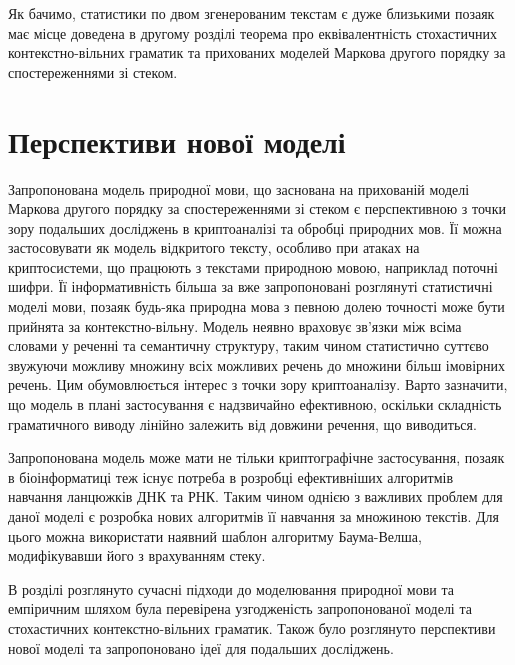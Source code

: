 Як бачимо, статистики по двом згенерованим текстам є дуже близькими позаяк має місце доведена в другому розділі теорема про еквівалентність стохастичних контекстно-вільних граматик та прихованих моделей Маркова другого порядку за спостереженнями зі стеком.

\section{Перспективи нової моделі}
Запропонована модель природної мови, що заснована на прихованій моделі Маркова другого порядку за спостереженнями зі стеком є перспективною з точки зору подальших досліджень в криптоаналізі та обробці природних мов. Її можна застосовувати як модель відкритого тексту, особливо при атаках на криптосистеми, що працюють з текстами природною мовою, наприклад поточні шифри. Її інформативність більша за вже запропоновані розглянуті статистичні моделі мови, позаяк будь-яка природна мова з певною долею точності може бути прийнята за контекстно-вільну. Модель неявно враховує зв'язки між всіма словами у реченні та семантичну структуру, таким чином статистично суттєво звужуючи можливу множину всіх можливих речень до множини більш імовірних речень. Цим обумовлюється інтерес з точки зору криптоаналізу. Варто зазначити, що модель в плані застосування є надзвичайно ефективною, оскільки складність граматичного виводу лінійно залежить від довжини речення, що виводиться.

Запропонована модель може мати не тільки криптографічне застосування, позаяк в біоінформатиці теж існує потреба в розробці ефективніших алгоритмів навчання ланцюжків ДНК та РНК. Таким чином однією з важливих  проблем для даної моделі є розробка нових алгоритмів її навчання за множиною текстів. Для цього можна використати наявний шаблон алгоритму Баума-Велша, модифікувавши його з врахуванням стеку.

\chapconclude{\ref{chap:practice}}
В розділі розглянуто сучасні підходи до моделювання природної мови та емпіричним шляхом була перевірена узгодженість запропонованої моделі та стохастичних контекстно-вільних граматик. Також було розглянуто перспективи нової моделі та запропоновано ідеї для подальших досліджень.
